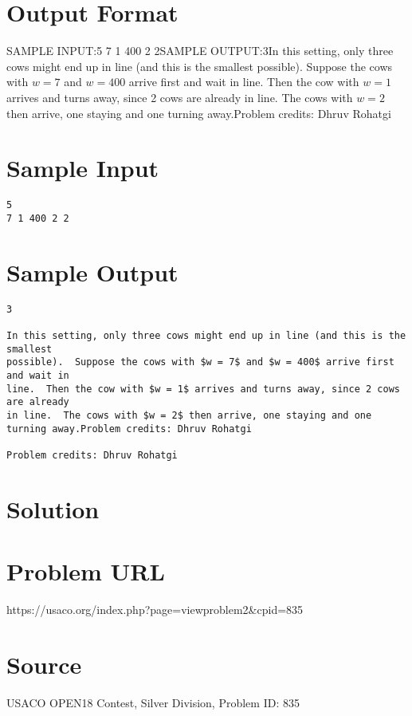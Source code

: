 \documentclass[12pt]{article}
\begin{document}
\section*{Output Format}
SAMPLE INPUT:5
7 1 400 2 2SAMPLE OUTPUT:3In this setting, only three cows might end up in line (and this is the smallest
possible).  Suppose the cows with $w = 7$ and $w = 400$ arrive first and wait in
line.  Then the cow with $w = 1$ arrives and turns away, since 2 cows are already
in line.  The cows with $w = 2$ then arrive, one staying and one turning away.Problem credits: Dhruv Rohatgi

\section*{Sample Input}
\begin{verbatim}
5
7 1 400 2 2
\end{verbatim}

\section*{Sample Output}
\begin{verbatim}
3

In this setting, only three cows might end up in line (and this is the smallest
possible).  Suppose the cows with $w = 7$ and $w = 400$ arrive first and wait in
line.  Then the cow with $w = 1$ arrives and turns away, since 2 cows are already
in line.  The cows with $w = 2$ then arrive, one staying and one turning away.Problem credits: Dhruv Rohatgi

Problem credits: Dhruv Rohatgi
\end{verbatim}

\section*{Solution}


\section*{Problem URL}
https://usaco.org/index.php?page=viewproblem2&cpid=835

\section*{Source}
USACO OPEN18 Contest, Silver Division, Problem ID: 835
\end{document}
